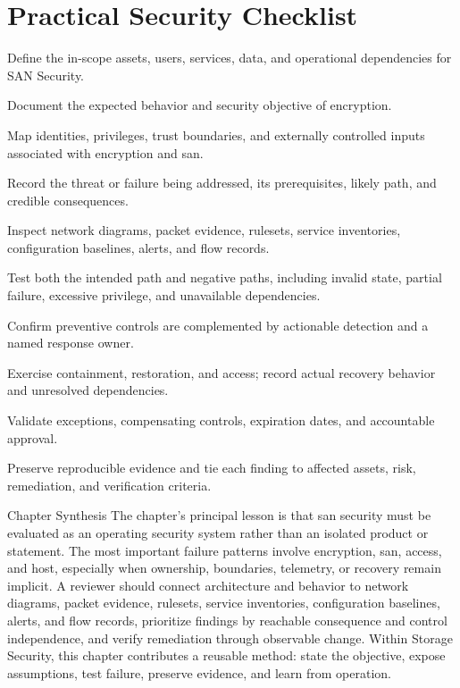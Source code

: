 \documentclass[11pt,letterpaper]{article}
\begin{document}
\section*{Practical Security Checklist}
\begin{CornellChecklist}
\item Define the in-scope assets, users, services, data, and operational dependencies for SAN Security.
\item Document the expected behavior and security objective of encryption.
\item Map identities, privileges, trust boundaries, and externally controlled inputs associated with encryption and san.
\item Record the threat or failure being addressed, its prerequisites, likely path, and credible consequences.
\item Inspect network diagrams, packet evidence, rulesets, service inventories, configuration baselines, alerts, and flow records.
\item Test both the intended path and negative paths, including invalid state, partial failure, excessive privilege, and unavailable dependencies.
\item Confirm preventive controls are complemented by actionable detection and a named response owner.
\item Exercise containment, restoration, and access; record actual recovery behavior and unresolved dependencies.
\item Validate exceptions, compensating controls, expiration dates, and accountable approval.
\item Preserve reproducible evidence and tie each finding to affected assets, risk, remediation, and verification criteria.
\end{CornellChecklist}
\begin{CornellSummaryBox}{Chapter Synthesis}
The chapter's principal lesson is that san security must be evaluated as an operating security system rather than an isolated product or statement. The most important failure patterns involve encryption, san, access, and host, especially when ownership, boundaries, telemetry, or recovery remain implicit. A reviewer should connect architecture and behavior to network diagrams, packet evidence, rulesets, service inventories, configuration baselines, alerts, and flow records, prioritize findings by reachable consequence and control independence, and verify remediation through observable change. Within Storage Security, this chapter contributes a reusable method: state the objective, expose assumptions, test failure, preserve evidence, and learn from operation.
\end{CornellSummaryBox}
\end{document}
